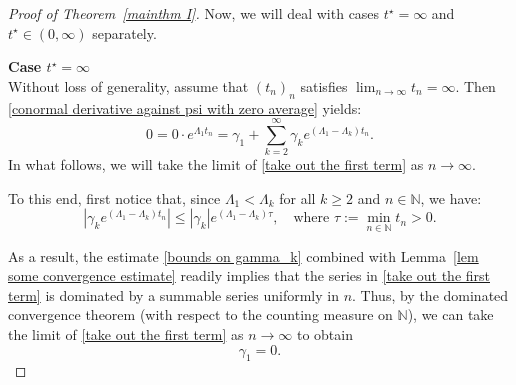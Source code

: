 \documentclass[a4paper,11pt]{article}
\numberwithin{equation}{section}
\begin{document}
\begin{proof}[Proof of Theorem~\ref{mainthm I}]
Now, we will deal with cases $t^\star=\infty$ and $t^\star\in (0,\infty)$ separately.

\noindent\textbf{Case $t^\star=\infty$}\\
Without loss of generality, assume that $(t_n)_n$ satisfies $\lim_{n\to\infty} t_n=\infty$.
Then \eqref{conormal derivative against psi with zero average} yields:
\begin{equation}\label{take out the first term}
    0= 0\cdot e^{\Lambda_1 t_n} = \gamma_1 + \sum_{k=2}^\infty \gamma_k e^{(\Lambda_1-\Lambda_k)t_n}.
\end{equation}
In what follows, we will take the limit of \eqref{take out the first term} as $n\to\infty$.

To this end, first notice that, since $\Lambda_1<\Lambda_k$ for all $k\ge 2$ and $n\in \mathbb{N}$, we have:
\begin{equation}\label{let's dominate}
    \left|\gamma_k e^{(\Lambda_1-\Lambda_k)t_n} \right|\le |\gamma_k|e^{(\Lambda_1-\Lambda_k)\tau}, \quad \text{where }\tau:=\min_{n\in\mathbb{N}}t_n>0.
\end{equation}

As a result, the estimate \eqref{bounds on gamma_k} combined with Lemma~\ref{lem some convergence estimate} readily implies that the series in \eqref{take out the first term} is dominated by a summable series uniformly in $n$. Thus, by the dominated convergence theorem (with respect to the counting measure on $\mathbb{N}$), we can take the limit of \eqref{take out the first term} as $n\to\infty$ to obtain 
\begin{equation}\label{gamma_1=0}
\gamma_1=0.    
\end{equation}


\end{proof}
\end{document}
